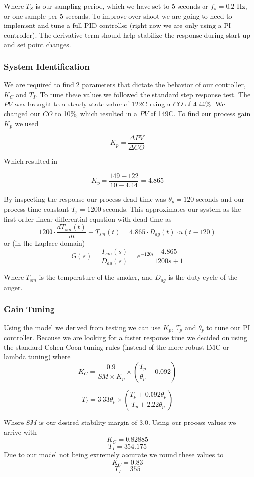 \documentclass{article}
\begin{document}
Where $T_S$ is our sampling period, which we have set to 5 seconds or $f_s=0.2$ Hz, or one sample per 5 seconds. To improve over shoot we are going to need to implement and tune a full PID controller (right now we are only using a PI controller). The derivative term should help stabilize the response during start up and set point changes.
\subsubsection{System Identification}
We are required to find 2 parameters that dictate the behavior of our controller, $K_C$ and $T_I$. To tune these values we followed the standard step response test. The $PV$ was brought to a steady state value of 122\degree C using a $CO$ of 4.44\%. We changed our $CO$ to 10\%, which resulted in a $PV$ of 149\degree C. To find our process gain $K_p$ we used

\[K_p = \frac{\Delta PV}{\Delta CO}\]

Which resulted in

\[ K_p = \frac{149-122}{10-4.44}=4.865\]

By inspecting the response our process dead time was $\theta_p = 120$ seconds and our process time constant $T_p = 1200$ seconds. This approximates our system as the first order linear differential equation with dead time as
\[ 1200\cdot \frac{dT_{sm}(t)}{dt}+T_{sm}(t)=4.865\cdot D_{ag}(t)\cdot u(t-120)\]
or (in the Laplace domain)
\[ G(s) = \frac{T_{sm}(s)}{D_{ag}(s)} = e^{-120s}\frac{4.865}{1200s+1}\]

Where $T_{sm}$ is the temperature of the smoker, and $D_{ag}$ is the duty cycle of the auger.
\subsubsection{Gain Tuning}
Using the model we derived from testing we can use $K_p$, $T_p$ and $\theta_p$ to tune our PI controller. Because we are looking for a faster response time we decided on using the standard Cohen-Coon tuning rules (instead of the more robust IMC or lambda tuning) where
\[ K_C = \frac{0.9}{SM \times K_p} \times \left( \frac{T_p}{\theta_p}+0.092 \right) \]

\[ T_I = 3.33\theta_p \times \left(\frac{T_p+0.092\theta_p}{T_p+2.22\theta_p}\right)\]

Where $SM$ is our desired stability margin of 3.0. Using our process values we arrive with 
\[ K_C = 0.82885\]
\[ T_I = 354.175\]
Due to our model not being extremely accurate we round these values to
\[ K_C = 0.83\]
\[ T_I = 355\]
\end{document}
